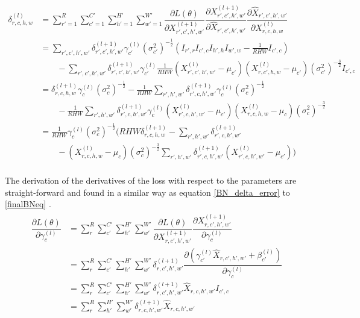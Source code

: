 \documentclass[a4paper, twoside]{article}
\newcommand*{\pd}[2]{\ensuremath{\dfrac{\partial #1}{\partial #2}}}
\begin{document}
\begin{equation}\label{finalBNeq}
\begin{split}
	\delta^{(l)}_{r,c,h,w} 
	& = \sum^{R }_{r'=1} \sum^{C' }_{c'=1} \sum^{H' }_{h'=1} \sum^{W' }_{w'=1} \pd{L(\theta)}{X^{(l+1)}_{r',c',h',w'}} \pd{X^{(l+1)}_{r',c',h',w'}}{\hat{X}_{r',c',h',w'}} \pd{\hat{X}_{r',c',h',w'}}{{X}^{(l)}_{r,c,h,w}}\\
	& = \sum\limits_{r',c',h',w'}\delta^{(l+1)}_{r',c',h',w'} \gamma^{(l)}_{c'} {(\sigma^2_{c'})}^{-\frac{1}{2}} (I_{r',r} I_{c',c} I_{h',h} I_{w',w} - \frac{1}{RHW} I_{c',c}) \\
	& \qquad -\sum\limits_{r',c',h',w'}\delta^{(l+1)}_{r',c',h',w'} \gamma^{(l)}_{c'} \frac{1}{RHW} ({X^{(l)}_{r',c',h',w'} - \mu_{c'}})({X^{(l)}_{r,c',h,w} - \mu_{c'}}) {(\sigma^2_{c'})}^{-\frac{3}{2}} I_{c',c} \\
	& = \delta^{(l+1)}_{r,c,h,w} \gamma^{(l)}_{c} {(\sigma^2_{c})}^{-\frac{1}{2}} - \frac{1}{RHW} \sum\limits_{r',h',w'} \delta^{(l+1)}_{r',c,h',w'} \gamma^{(l)}_{c} {(\sigma^2_{c})}^{-\frac{1}{2}}\\
	& \qquad - \frac{1}{RHW} \sum\limits_{r',h',w'} \delta^{(l+1)}_{r',c,h',w'}\gamma^{(l)}_{c} ({X^{(l)}_{r',c,h',w'} - \mu_{c'}})({X^{(l)}_{r,c,h,w} - \mu_{c}}){(\sigma^2_{c})}^{-\frac{3}{2}} \\
	& = \frac{1}{RHW} \gamma^{(l)}_c {(\sigma^2_{c})}^{-\frac{1}{2}} \biggl(    RHW \delta^{(l+1)}_{r,c,h,w} -  \sum\limits_{r',h',w'} \delta^{(l+1)}_{r',c,h',w'} \qquad \\
	& \qquad -  ({X^{(l)}_{r,c,h,w} - \mu_{c}}) {(\sigma^2_{c})}^{-\frac{3}{2}} \sum\limits_{r',h',w'} \delta^{(l+1)}_{r',c,h',w'} ({X^{(l)}_{r',c,h',w'} - \mu_{c'}}) \biggl) \\
\end{split}
\end{equation}

The derivation of the derivatives of the loss with respect to the parameters are straight-forward and found in a similar way as equation \eqref{BN_delta_error} to \eqref{finalBNeq} \cite{webBN1} \cite{webBN2}. 
\begin{align}
\begin{split}
	\pd{L(\theta)}{\gamma^{(l)}_{c}}
		& = \sum^{R }_{r} \sum^{C' }_{c'} \sum^{H' }_{h'} \sum^{W' }_{w'} \pd{L(\theta)}{X^{(l+1)}_{r,c',h',w'}} \pd{X^{(l+1)}_{r,c',h',w'}}{\gamma^{(l)}_{c}} \\
		& = \sum^{R }_{r} \sum^{C' }_{c'} \sum^{H' }_{h'} \sum^{W' }_{w'} \delta^{(l+1)}_{r,c',h',w'}  \pd{({\gamma_{c'}^{(l)} \hat{X}_{r,c',h',w'} + \beta_{c'}^{(l)}})}{\gamma^{(l)}_{c}} \\
		& = \sum^{R }_{r} \sum^{C' }_{c'} \sum^{H' }_{h'} \sum^{W' }_{w'} \delta^{(l+1)}_{r,c',h',w'} \hat{X}_{r,c,h',w'} I_{c',c}\\
		& = \sum^{R }_{r} \sum^{H' }_{h'} \sum^{W' }_{w'} \delta^{(l+1)}_{r,c,h',w'} \hat{X}_{r,c,h',w'} \\
\end{split}
\end{align}
\end{document}
